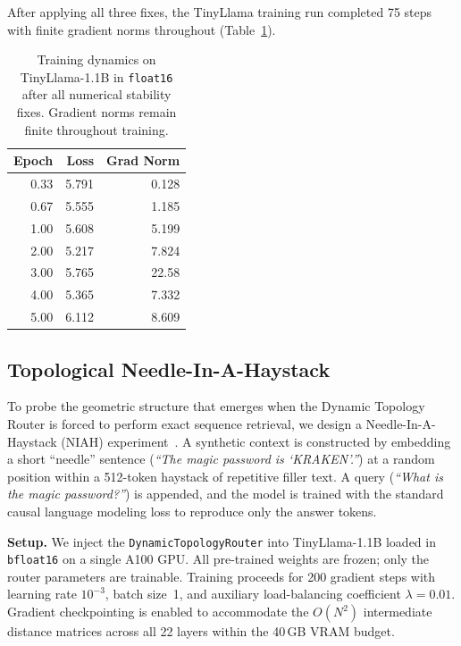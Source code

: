 \documentclass[11pt,a4paper]{article}
\begin{document}
After applying all three fixes, the TinyLlama training run completed 75 steps with finite gradient norms throughout (Table~\ref{tab:fp16_training}).

\begin{table}[h]
\centering
\caption{Training dynamics on TinyLlama-1.1B in \texttt{float16} after all numerical stability fixes. Gradient norms remain finite throughout training.}
\label{tab:fp16_training}
\begin{tabular}{@{}rrr@{}}
\toprule
Epoch & Loss & Grad Norm \\
\midrule
0.33 & 5.791 & 0.128 \\
0.67 & 5.555 & 1.185 \\
1.00 & 5.608 & 5.199 \\
2.00 & 5.217 & 7.824 \\
3.00 & 5.765 & 22.58 \\
4.00 & 5.365 & 7.332 \\
5.00 & 6.112 & 8.609 \\
\bottomrule
\end{tabular}
\end{table}

\subsection{Topological Needle-In-A-Haystack}
\label{sec:niah}

To probe the geometric structure that emerges when the Dynamic Topology Router is forced to perform exact sequence retrieval, we design a Needle-In-A-Haystack (NIAH) experiment~\citep{liu2024lost}. A synthetic context is constructed by embedding a short ``needle'' sentence (\emph{``The magic password is `KRAKEN'.''}) at a random position within a 512-token haystack of repetitive filler text. A query (\emph{``What is the magic password?''}) is appended, and the model is trained with the standard causal language modeling loss to reproduce only the answer tokens.

\textbf{Setup.} We inject the \texttt{DynamicTopologyRouter} into TinyLlama-1.1B loaded in \texttt{bfloat16} on a single A100 GPU. All pre-trained weights are frozen; only the router parameters are trainable. Training proceeds for 200 gradient steps with learning rate $10^{-3}$, batch size~1, and auxiliary load-balancing coefficient $\lambda = 0.01$. Gradient checkpointing is enabled to accommodate the $O(N^2)$ intermediate distance matrices across all 22 layers within the 40\,GB VRAM budget.
\end{document}
